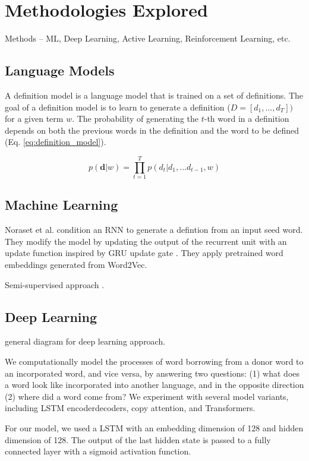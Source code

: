 \section{Methodologies Explored}
Methods -- ML, Deep Learning, Active Learning, Reinforcement Learning, etc.

\subsection{Language Models}
A definition model is a language model that is trained on a set of definitions.
The goal of a definition model is to learn to generate a definition ($ D = [d_1,
    ..., d_T])$ for a given term $w$. The probability of generating the $t$-th word
in a definition depends on both the previous words in the definition and the
word to be defined (Eq. \ref{eq:definition_model}).

\begin{equation}
    \label{eq:definition_model}
    p(\textbf{d} | w) = \prod_{t=1}^{T} p(d_t | d_1,...d_{t-1}, w)
\end{equation}

\subsection{Machine Learning}
Noraset et al. condition an RNN to generate a defintion from an input seed word.
They modify the model by updating the output of the recurrent unit with an
update function inspired by GRU update gate \cite{noraset_definition_2016}. They
apply pretrained word embeddings generated from Word2Vec.

Semi-supervised approach \cite{patra_bilingual_2019}.

\subsection{Deep Learning}
general diagram for deep learning approach.

\cite{wu_2021_sequence}We computationally model the processes of
word borrowing from a donor word to an incorporated
word, and vice versa, by answering
two questions: (1) what does a word look
like incorporated into another language, and
in the opposite direction (2) where did a word
come from? We experiment with several
model variants, including LSTM encoderdecoders,
copy attention, and Transformers.

\cite{wu_computational_2020} For our model, we used a LSTM with an embedding
dimension of 128 and hidden dimension of 128.
The output of the last hidden state is passed to a fully connected layer with a sigmoid activation function.



